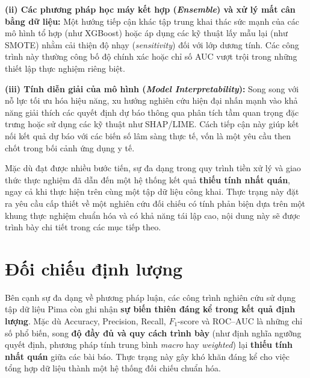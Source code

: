 \documentclass[14pt,a4paper]{extreport}
\begin{document}
\textbf{(ii) Các phương pháp học máy kết hợp (\textit{Ensemble}) và xử lý mất cân bằng dữ liệu:} Một hướng tiếp cận khác tập trung khai thác sức mạnh của các mô hình tổ hợp (như XGBoost) hoặc áp dụng các kỹ thuật lấy mẫu lại (như SMOTE) nhằm cải thiện độ nhạy (\textit{sensitivity}) đối với lớp dương tính. Các công trình này thường công bố độ chính xác hoặc chỉ số AUC vượt trội trong những thiết lập thực nghiệm riêng biệt.\cite{kirbas2025shap,zhang2025pima}

\textbf{(iii) Tính diễn giải của mô hình (\textit{Model Interpretability}):} Song song với nỗ lực tối ưu hóa hiệu năng, xu hướng nghiên cứu hiện đại nhấn mạnh vào khả năng giải thích các quyết định dự báo thông qua phân tích tầm quan trọng đặc trưng hoặc sử dụng các kỹ thuật như SHAP/LIME. Cách tiếp cận này giúp kết nối kết quả dự báo với các biến số lâm sàng thực tế, vốn là một yêu cầu then chốt trong bối cảnh ứng dụng y tế.\cite{kirbas2025shap,chang2022pima}

Mặc dù đạt được nhiều bước tiến, sự đa dạng trong quy trình tiền xử lý và giao thức thực nghiệm đã dẫn đến một hệ thống kết quả \textbf{thiếu tính nhất quán}, ngay cả khi thực hiện trên cùng một tập dữ liệu công khai. Thực trạng này đặt ra yêu cầu cấp thiết về một nghiên cứu đối chiếu có tính phản biện dựa trên một khung thực nghiệm chuẩn hóa và có khả năng tái lập cao, nội dung này sẽ được trình bày chi tiết trong các mục tiếp theo.

\section{Đối chiếu định lượng}

Bên cạnh sự đa dạng về phương pháp luận, các công trình nghiên cứu sử dụng tập dữ liệu Pima còn ghi nhận \textbf{sự biến thiên đáng kể trong kết quả định lượng}. Mặc dù Accuracy, Precision, Recall, $F_1$-score và ROC--AUC là những chỉ số phổ biến, song \textbf{độ đầy đủ và quy cách trình bày} (như định nghĩa ngưỡng quyết định, phương pháp tính trung bình \textit{macro} hay \textit{weighted}) lại \textbf{thiếu tính nhất quán} giữa các bài báo. Thực trạng này gây khó khăn đáng kể cho việc tổng hợp dữ liệu thành một hệ thống đối chiếu chuẩn hóa.\cite{chang2022pima,kirbas2025shap}
\end{document}
